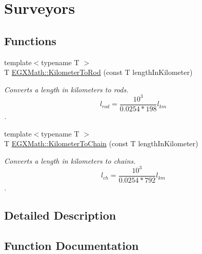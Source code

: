 \hypertarget{group___e_g_x_math-_conversions-_length_conversions-_kilometer-_surveyors}{}\section{Surveyors}
\label{group___e_g_x_math-_conversions-_length_conversions-_kilometer-_surveyors}
\subsection*{Functions}
\begin{DoxyCompactItemize}
\item 
{\footnotesize template$<$typename T $>$ }\\T \mbox{\hyperlink{group___e_g_x_math-_conversions-_length_conversions-_kilometer-_surveyors_gae57f6033d241f64aa645a42bfe354567}{E\+G\+X\+Math\+::\+Kilometer\+To\+Rod}} (const T length\+In\+Kilometer)
\begin{DoxyCompactList}\small\item\em Converts a length in kilometers to rods. \[ l_{rod}= \frac{10^{3}}{0.0254 * 198} l_{km} \]. \end{DoxyCompactList}\item 
{\footnotesize template$<$typename T $>$ }\\T \mbox{\hyperlink{group___e_g_x_math-_conversions-_length_conversions-_kilometer-_surveyors_ga42dd7fe86fb9ffdbc0a82b58876f9d6d}{E\+G\+X\+Math\+::\+Kilometer\+To\+Chain}} (const T length\+In\+Kilometer)
\begin{DoxyCompactList}\small\item\em Converts a length in kilometers to chains. \[ l_{ch}= \frac{10^{3}}{0.0254 * 792} l_{km} \]. \end{DoxyCompactList}\end{DoxyCompactItemize}


\subsection{Detailed Description}


\subsection{Function Documentation}
\mbox{\label{group___e_g_x_math-_conversions-_length_conversions-_kilometer-_surveyors_ga42dd7fe86fb9ffdbc0a82b58876f9d6d}} 
